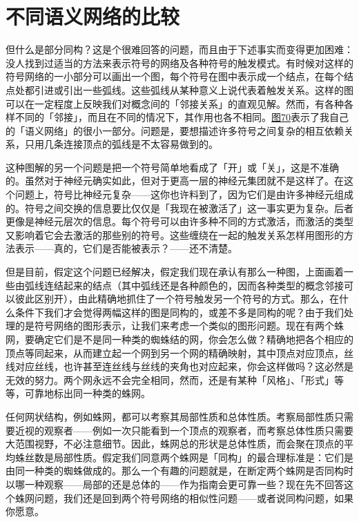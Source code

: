 \documentclass[
  12pt,
  twoside,
  openright,
  oldfontcommands,
]{memoir}
\begin{document}
\section{不同语义网络的比较}

但什么是部分同构？这是个很难回答的问题，而且由于下述事实而变得更加困难：没人找到过适当的方法来表示符号的网络及各种符号的触发模式。有时候对这样的符号网络的一小部分可以画出一个图，每个符号在图中表示成一个结点，在每个结点处都引进或引出一些弧线。这些弧线从某种意义上说代表着触发关系。这样的图可以在一定程度上反映我们对概念间的「邻接关系」的直观见解。然而，有各种各样不同的「邻接」，而且在不同的情况下，其作用也各不相同。\hyperref[fig:70]{图70}表示了我自己的「语义网络」的很小一部分。问题是，要想描述许多符号之间复杂的相互依赖关系，只用几条连接顶点的弧线是不太容易做到的。

这种图解的另一个问题是把一个符号简单地看成了「开」或「关」，这是不准确的。虽然对于神经元确实如此，但对于更高一层的神经元集团就不是这样了。在这个问题上，符号比神经元复杂------这你也许料到了，因为它们是由许多神经元组成的。符号之间交换的信息要比仅仅是「我现在被激活了」这一事实更为复杂。后者更像是神经元层次的信息。每个符号可以由许多种不同的方式激活，而激活的类型又影响着它会去激活的那些别的符号。这些缠绕在一起的触发关系怎样用图形的方法表示------真的，它们是否能被表示？------还不清楚。

但是目前，假定这个问题已经解决，假定我们现在承认有那么一种图，上面画着一些由弧线连结起来的结点（其中弧线还是各种颜色的，因而各种类型的概念邻接可以彼此区别开），由此精确地抓住了一个符号触发另一个符号的方式。那么，在什么条件下我们才会觉得两幅这样的图是同构的，或差不多是同构的呢？由于我们处理的是符号网络的图形表示，让我们来考虑一个类似的图形问题。现在有两个蛛网，要确定它们是不是同一种类的蜘蛛结的网，你会怎么做？精确地把各个相应的顶点等同起来，从而建立起一个网到另一个网的精确映射，其中顶点对应顶点，丝线对应丝线，也许甚至连丝线与丝线的夹角也对应起来，你会这样做吗？这必然是无效的努力。两个网永远不会完全相同，然而，还是有某种「风格」、「形式」等等，可靠地标出同一种类的蛛网。

任何网状结构，例如蛛网，都可以考察其局部性质和总体性质。考察局部性质只需要近视的观察者------例如一次只能看到一个顶点的观察者，而考察总体性质只需要大范围视野，不必注意细节。因此，蛛网总的形状是总体性质，而会聚在顶点的平均蛛丝数是局部性质。假定我们同意两个蛛网是「同构」的最合理标准是：它们是由同一种类的蜘蛛做成的。那么一个有趣的问题就是，在断定两个蛛网是否同构时以哪一种观察------局部的还是总体的------作为指南会更可靠一些？现在先不回答这个蛛网问题，我们还是回到两个符号网络的相似性问题------或者说同构问题，如果你愿意。
\end{document}

